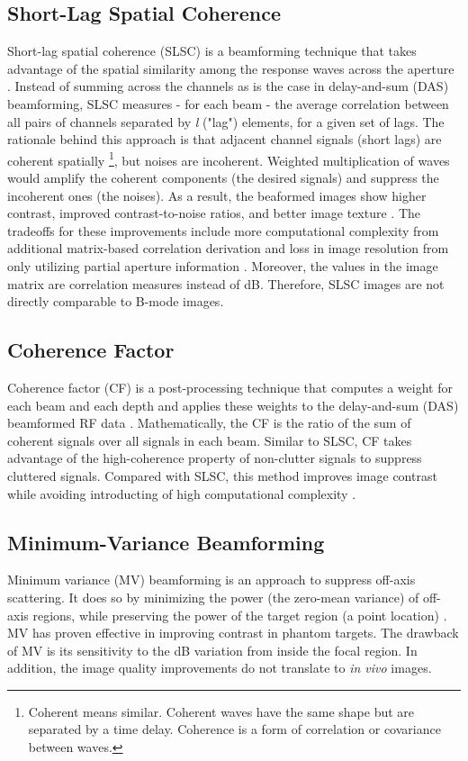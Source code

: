     \subsection{Short-Lag Spatial Coherence}
      Short-lag spatial coherence (SLSC) is a beamforming technique that takes advantage of the spatial similarity among the response waves across the aperture \cite{slsc}. Instead of summing across the channels as is the case in delay-and-sum (DAS) beamforming, SLSC measures - for each beam - the average correlation between all pairs of channels separated by \textit{l} ("lag") elements, for a given set of lags. The rationale behind this approach is that adjacent channel signals (short lags) are coherent spatially \footnote{Coherent means similar. Coherent waves have the same shape but are separated by a time delay. Coherence is a form of correlation or covariance between waves.}, but noises are incoherent. Weighted multiplication of waves would amplify the coherent components (the desired signals) and suppress the incoherent ones (the noises). As a result, the beaformed images show higher contrast, improved contrast-to-noise ratios, and better image texture \cite{dahl2017coherence}. The tradeoffs for these improvements include more computational complexity from additional matrix-based correlation derivation and loss in image resolution from only utilizing partial aperture information \cite{lediju2015resolution}. Moreover, the values in the image matrix are correlation measures instead of dB. Therefore, SLSC images are not directly comparable to B-mode images.

    \subsection{Coherence Factor}
      Coherence factor (CF) is a post-processing technique that computes a weight for each beam and each depth and applies these weights to the delay-and-sum (DAS) beamformed RF data \cite{mallart1994adaptive, hollman1999coherence}. Mathematically, the CF is the ratio of the sum of coherent signals over all signals in each beam. Similar to SLSC, CF takes advantage of the high-coherence property of non-clutter signals to suppress cluttered signals. Compared with SLSC, this method improves image contrast while avoiding introducting of high computational complexity \cite{dei_thesis}. %

    \subsection{Minimum-Variance Beamforming}
      Minimum variance (MV) beamforming is an approach to suppress off-axis scattering. It does so by minimizing the power (the zero-mean variance) of off-axis regions, while preserving the power of the target region (a point location) \cite{synnevag2007adaptive, holfort2009broadband}. MV has proven effective in improving contrast in phantom targets. The drawback of MV is its sensitivity to the dB variation from inside the focal region. In addition, the image quality improvements do not translate to \textit{in vivo} images. %

